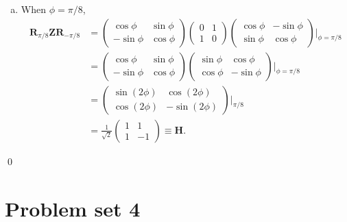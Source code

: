\documentclass{book}
\theoremstyle{definition}
\newcommand{\nn}{\nonumber}
\newcommand{\f}[2]{\frac{#1}{#2}}
\newcommand{\Z}{\mathbf{Z}}
\newcommand{\had}{\mathbf{H}}
\begin{document}
\begin{enumerate}[(a)]
	\item When $\phi = \pi/8$,
	\begin{align}
	\mathbf{R}_{\pi/8}\Z \mathbf{R}_{-\pi/8} &= \begin{pmatrix}
	\cos\phi & \sin\phi \\ -\sin\phi & \cos\phi
	\end{pmatrix}\begin{pmatrix}
	0&1\\1&0
	\end{pmatrix}\begin{pmatrix}
	\cos\phi & -\sin\phi \\ \sin\phi & \cos\phi
	\end{pmatrix}\bigg\vert_{\phi = \pi/8}\nn\\
	&= \begin{pmatrix}
	\cos\phi & \sin\phi \\ -\sin\phi & \cos\phi
	\end{pmatrix}\begin{pmatrix}
	\sin\phi & \cos\phi \\ \cos\phi & -\sin\phi
	\end{pmatrix}\bigg\vert_{\phi = \pi/8}\nn\\
	&= \begin{pmatrix}
	\sin(2\phi) &  \cos(2\phi)  \\ \cos(2\phi) & -\sin(2\phi)
	\end{pmatrix}\bigg\vert_{\pi/8}\nn\\
	&= \f{1}{\sqrt{2}}\begin{pmatrix}
	1 & 1 \\ 1 & -1
	\end{pmatrix} \equiv \had.
	\end{align}
\end{enumerate}\qed





















\newpage



\section{Problem set 4}
\end{document}
